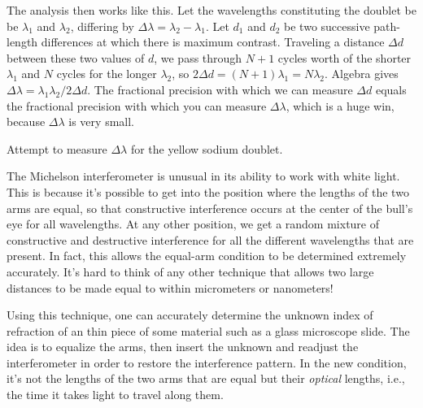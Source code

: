 The analysis then works like this. Let the wavelengths constituting the doublet be
be $\lambda_1$ and $\lambda_2$, differing by $\Delta \lambda = \lambda_2-\lambda_1$.
Let $d_1$ and $d_2$ be two successive path-length differences at which there is maximum
          contrast. Traveling a distance $\Delta d$
          between these two values of $d$, we pass through $N+1$ cycles worth of the shorter
          $\lambda_1$ and $N$ cycles  for the longer $\lambda_2$, so
          $2 \Delta d = (N+1) \lambda_1=N \lambda_2$. Algebra gives
          $\Delta \lambda=\lambda_1 \lambda_2/2 \Delta d$.
    The fractional precision with which we can measure $\Delta d$ equals the fractional
           precision with which you can measure $\Delta \lambda$, which is a huge win,
           because $\Delta \lambda$ is very small.

Attempt to measure $\Delta \lambda$ for the yellow sodium doublet.


The Michelson interferometer is unusual in its ability to work with white light.
This is because it's possible to get into the position where the lengths of the
two arms are equal, so that constructive interference occurs at the center of
the bull's eye for all wavelengths. At any other position, we get
a random mixture of constructive and destructive interference for all the different
wavelengths that are present. In fact, this allows the equal-arm condition
to be determined extremely accurately. It's hard to think of any other technique
that allows two large distances to be made equal to within micrometers or nanometers!

Using this technique, one can accurately determine the unknown index of refraction of an
thin piece of some material such as a glass microscope slide. The idea is to equalize
the arms, then insert the unknown and readjust the interferometer in order to
restore the interference pattern. In the new condition, it's not the lengths of the
two arms that are equal but their \emph{optical} lengths, i.e., the time it takes
light to travel along them.

